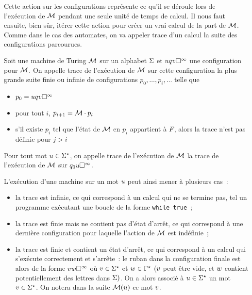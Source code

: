 Cette action sur les configurations représente ce qu'il se déroule lors de
l'exécution de $\mathcal{M}$ pendant une seule unité de temps de calcul. Il nous
faut ensuite, bien sûr, itérer cette action pour créer un vrai calcul de la part
de $\mathcal{M}$. Comme dans le cas des automates, on va appeler trace d'un calcul
la suite des configurations parcourues.

\begin{definition}
  Soit une machine de Turing $\mathcal{M}$ sur un alphabet $\Sigma$ et
  $uq_{}v\square^{\infty}$ une configuration pour $\mathcal{M}$. On appelle trace
  de l'exécution de $\mathcal{M}$ sur cette configuration la plus grande suite finie
  ou infinie de configurations $p_0,\ldots,p_i,\ldots$ telle que
  \begin{itemize}
  \item $p_0 = uq_{}v\square^{\infty}$
  \item pour tout $i$, $p_{i+1} = \mathcal{M}\mathbin{\cdot} p_i$
  \item s'il existe $p_i$ tel que l'état de $\mathcal{M}$ en $p_i$ appartient à
    $F_{}$, alors la trace n'est pas définie pour $j > i$
  \end{itemize}

  Pour tout mot $u \in \Sigma^{\star}$, on appelle trace de l'exécution de
  $\mathcal{M}$ la trace de l'exécution de $\mathcal{M}$ sur $q_{0}u\square^{\infty}$.
\end{definition}

L'exécution d'une machine sur un mot $u$ peut ainsi mener à plusieurs cas~:
\begin{itemize}
\item la trace est infinie, ce qui correspond à un calcul qui ne se termine pas,
  tel un programme exécutant une boucle de la forme \texttt{while true}~;
\item la trace est finie mais ne contient pas d'état d'arrêt, ce qui correspond
  à une dernière configuration pour laquelle l'action de $\mathcal{M}$ est
  indéfinie~;
\item la trace est finie et contient un état d'arrêt, ce qui correspond à un
  calcul qui s'exécute correctement et s'arrête~: le ruban dans la configuration
  finale est alors de la forme $vw\square^{\infty}$ où $v \in \Sigma^{\star}$ et
  $w \in \Gamma^{\star}$ ($v$ peut être vide, et $w$ contient
  potentiellement des lettres dans $\Sigma)$. On a alors associé à
  $u\in\Sigma^{\star}$ un mot $v \in \Sigma^{\star}$. On notera dans la suite
  $\mathcal{M}(u)$ ce mot $v$.
\end{itemize}

